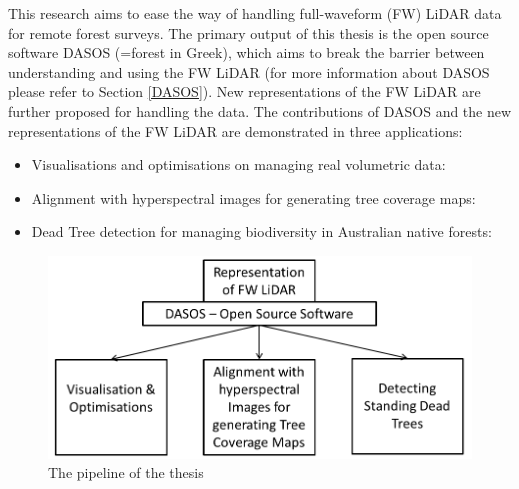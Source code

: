 \documentclass{subfiles}
\begin{document}
	

	
\par This research aims to ease the way of handling full-waveform (FW) LiDAR  data for remote forest surveys. The primary output of this thesis is the open source software DASOS (=forest in Greek), which aims to break the barrier between understanding and using the FW LiDAR (for more information about DASOS please refer to Section \ref{DASOS}). New representations of the FW LiDAR are further proposed for handling the data. The contributions of DASOS and the new representations of the FW LiDAR are demonstrated in three applications: 

\begin{itemize}
	\item Visualisations and optimisations on managing real volumetric data:
	
	\item Alignment with hyperspectral images for generating tree coverage maps:
	
	\item Dead Tree detection for managing biodiversity in Australian native forests:
	

\end{itemize}

\begin{figure}
	\includegraphics[width=\textwidth]{tex/Pipeline/Pipeline.png}
	\caption{The pipeline of the thesis}
\end{figure}
\end{document}
